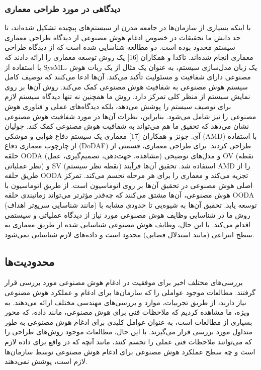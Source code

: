 \documentclass[a4paper,10pt]{article}
\begin{document}
            \subsubsection{دیدگاهی در مورد طراحی معماری}

                با اینکه بسیاری از سازمان‌ها در جامعه مدرن از سیستم‌های پیچیده تشکیل شده‌اند، تا حد دانش ما تحقیقات در خصوص ادغام هوش مصنوعی از دیدگاه طراحی معماری سیستم محدود بوده است. دو مطالعه شناسایی شده است که از دیدگاه طراحی معماری انجام شده‌اند. تاکدا و همکاران [16] یک روش توسعه معماری را ارائه دادند که با استفاده از SysML، یک زبان مدل‌سازی سیستم، به عنوان یک مثال از یک ربات هوش مصنوعی دارای شفافیت و مسئولیت تأکید می‌کند. آن‌ها ادعا می‌کنند که توصیف کامل سیستم هوش مصنوعی به شفافیت هوش مصنوعی کمک می‌کند. روش آن‌ها بر روی نمایش سیستم از منظر کلی تمرکز دارد. روش ما همچنین نه تنها دیدگاه سیستم لازم برای توصیف سیستم را پوشش می‌دهد، بلکه دیدگاه‌های عملی و فناوری هوش مصنوعی را نیز شامل می‌شود. بنابراین، نظرات آن‌ها در مورد شفافیت هوش مصنوعی نشان می‌دهد که تحقیق ما هم می‌تواند به شفافیت هوش مصنوعی کمک کند. جولیان آی. جونز و همکاران [17] معماری یک سیستم دفاع هوایی و موشکی (AMD) با استفاده از چارچوب معماری دفاع (DoDAF) طراحی کردند. برای طراحی معماری، قسمتی از حلقه OODA (مشاهده، جهت‌دهی، تصمیم‌گیری، عمل) و مدل‌های توضیحی OV (نقطه نظر عملیاتی) و SV (نقطه نظر سیستم) استفاده شد. تحقیق آن‌ها فرآیند AMD را از طریق حلقه OODA تجزیه می‌کند و معماری را برای هر مرحله تجسم می‌کند. تمرکز اصلی هوش مصنوعی در تحقیق آن‌ها بر روی اتوماسیون است. از طریق اتوماسیون با هوش مصنوعی، آن‌ها مشتق می‌کنند که چه‌قدر مؤثرتر می‌تواند زمانبندی حلقه OODA (مانند شناسایی سریع‌تر اهداف) توسعه یابد. تحقیق آن‌ها به شیوه‌یی تا حدودی مشابه با روش ما در شناسایی وظایف هوش مصنوعی مورد نیاز از دیدگاه عملیاتی و سیستمی اقدام می‌کند. با این حال، وظایف هوش مصنوعی شناسایی شده از طریق معماری به سطح انتزاعی (مانند استدلال فضایی) محدود است و داده‌های لازم شناسایی نمی‌شود.

        \subsection{محدودیت‌ها}

            بررسی‌های مختلف اخیر برای موفقیت در ادغام هوش مصنوعی مورد بررسی قرار گرفتند. مطالعات موجود عواملی را که سازمان‌ها برای ادغام و عملکرد هوش مصنوعی نیاز دارند، از طریق تجربیات، موارد و بررسی‌های مهندسی مختلف ارائه می‌دهند. به ویژه، ما مشاهده کردیم که ملاحظات فنی برای هوش مصنوعی، مانند داده، که محور بسیاری از مطالعات است، به عنوان عوامل کلیدی برای ادغام هوش مصنوعی به طور متداول مورد بررسی قرار می‌گیرند. با این حال، مطالعات موجود روش‌های طراحی را که می‌توانند ملاحظات فنی عملی را تجسم کنند، مانند آنچه که در واقع برای داده لازم است و چه سطح عملکرد هوش مصنوعی برای ادغام هوش مصنوعی توسط سازمان‌ها لازم است، پوشش نمی‌دهند.
\end{document}
